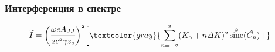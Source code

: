 \documentclass[14pt, hyperref = {colorlinks}]{beamer}
\DeclareMathOperator{\sinc}{sinc}
\begin{document}
\small
\begin{frame}
\frametitle{Интерференция в спектре}\label{t1}
\vspace{-5pt}
\begin{figure}[h]
	\begin{minipage}[h]{0.49\linewidth}
		\vspace{-10pt}
	\end{minipage}
	\begin{minipage}[h]{0.49\linewidth}
		\vspace{-10pt}
	\end{minipage}
\end{figure}
\vspace{-20pt}
\begin{figure}[h]
	$\mathnormal{{\widetilde{I}} =
		\bigg(\cfrac{\omega eA_{JJ}}{2c^2 \gamma z_0}\bigg)^2\bigg[
		\textcolor{gray}{\displaystyle\sum\limits_{n =-2}^{2}(K_0 + n\Delta K)^2\sinc^2(\hat{C_n}) + }}$\\
	

\end{figure}
\end{frame}
\end{document}
